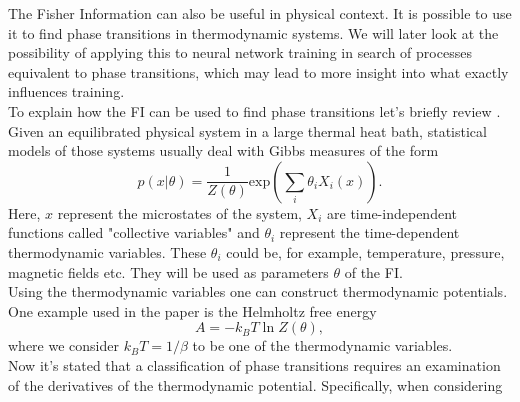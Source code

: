 The Fisher Information can also be useful in physical context. It is possible to use it to find phase transitions in thermodynamic systems. We will later look at the possibility of applying this to neural network training in search of processes equivalent to phase transitions, which may lead to more insight into what exactly influences training.\\
To explain how the FI can be used to find phase transitions let's briefly review \cite{Prokopenko}.\\
Given an equilibrated physical system in a large thermal heat bath, statistical models of those systems usually deal with Gibbs measures of the form 
\begin{equation}
	p(x|\theta) = \frac{1}{Z(\theta)} \mathrm{exp}\left(\sum_i \theta_i X_i(x)\right).
\end{equation}
Here, $x$ represent the microstates of the system, $X_i$ are time-independent functions called "collective variables" and $\theta_i$ represent the time-dependent thermodynamic variables. These $\theta_i$ could be, for example, temperature, pressure, magnetic fields etc. They will be used as parameters $\theta$ of the FI.\\
Using the thermodynamic variables one can construct thermodynamic potentials. One example used in the paper is the Helmholtz free energy 
\begin{equation}
	A = - k_B T \ln Z(\theta),
\end{equation}
where we consider $k_B T = 1/\beta$ to be one of the thermodynamic variables. \\
Now it's stated that a classification of phase transitions requires an examination of the derivatives of the thermodynamic potential. Specifically, when considering 